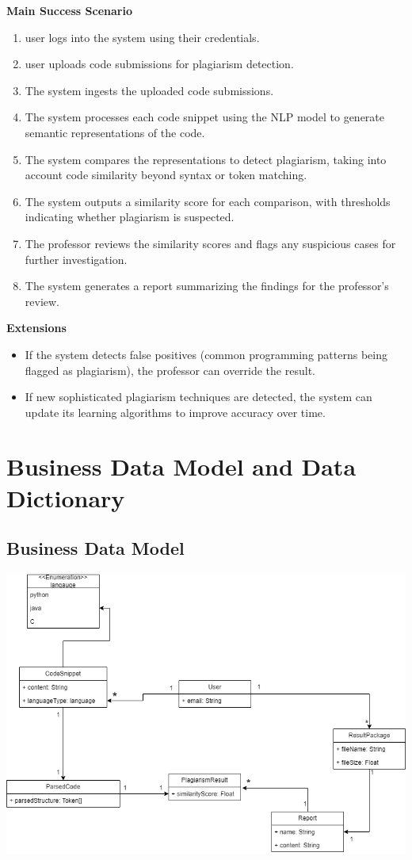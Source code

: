 \documentclass[12pt]{article}
\begin{document}
\textbf{Main Success Scenario}
\begin{enumerate}
    \item user logs into the system using their credentials.
    \item user uploads code submissions for plagiarism detection.
    \item The system ingests the uploaded code submissions.
    \item The system processes each code snippet using the NLP model to generate semantic representations of the code.
    \item The system compares the representations to detect plagiarism, taking into account code similarity beyond syntax or token matching.
    \item The system outputs a similarity score for each comparison, with thresholds indicating whether plagiarism is suspected.
    \item The professor reviews the similarity scores and flags any suspicious cases for further investigation.
    \item The system generates a report summarizing the findings for the professor’s review.
\end{enumerate}

\textbf{Extensions}
\begin{itemize}
    \item If the system detects false positives (common programming patterns being flagged as plagiarism), the professor can override the result.
    \item If new sophisticated plagiarism techniques are detected, the system can update its learning algorithms to improve accuracy over time.
\end{itemize}

\section{Business Data Model and Data Dictionary}
\subsection{Business Data Model}
\includegraphics[height=.58\textheight]{./assets/UML.png}
\end{document}
